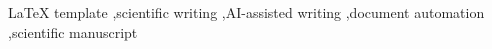 
\begin{keyword}
LaTeX template \sep scientific writing \sep AI-assisted writing \sep document automation \sep scientific manuscript
\end{keyword}


